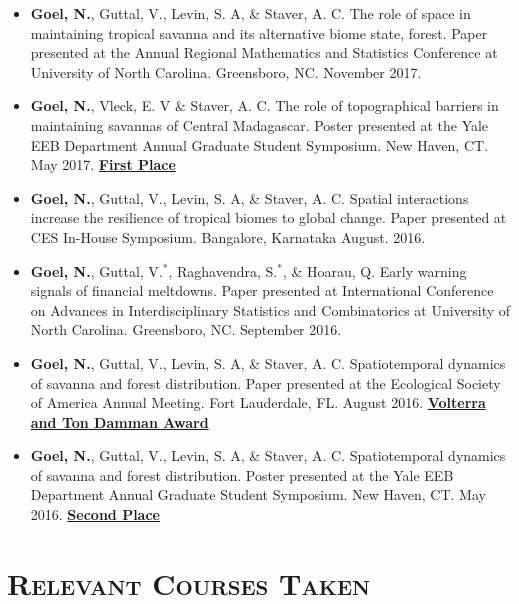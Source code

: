 \documentclass[11pt,a4paper,sans]{moderncv}        %
\begin{document}
\begin{itemize}

\item{\textbf{Goel, N.}, Guttal, V., Levin, S. A, \& Staver, A. C. The role of space in maintaining tropical savanna and its alternative biome state, forest. Paper presented at the Annual Regional Mathematics and Statistics Conference at University of North Carolina. Greensboro, NC. November 2017.}\\

\item{\textbf{Goel, N.}, Vleck, E. V \& Staver, A. C. The role of topographical barriers in maintaining savannas of Central Madagascar. Poster presented at the Yale EEB Department Annual Graduate Student Symposium. New Haven, CT. May 2017. \underline{\textbf{First Place}}}\\

\item{\textbf{Goel, N.}, Guttal, V., Levin, S. A, \& Staver, A. C. Spatial interactions increase the resilience of tropical biomes to global change. Paper presented at CES In-House Symposium. Bangalore, Karnataka August. 2016.}\\

\item{\textbf{Goel, N.}, Guttal, V.$^*$, Raghavendra, S.$^*$, \& Hoarau, Q. Early warning signals of financial meltdowns. Paper presented at International Conference on Advances in Interdisciplinary Statistics and Combinatorics at University of North Carolina. Greensboro, NC. September 2016.}\\

\item{\textbf{Goel, N.}, Guttal, V., Levin, S. A, \& Staver, A. C. Spatiotemporal dynamics of savanna and forest distribution. Paper presented at the Ecological Society of America Annual Meeting. Fort Lauderdale, FL. August 2016. \underline{\textbf{Volterra and Ton Damman Award}}}\\

\item{\textbf{Goel, N.}, Guttal, V., Levin, S. A, \& Staver, A. C. Spatiotemporal dynamics of savanna and forest distribution. Poster presented at the Yale EEB Department Annual Graduate Student Symposium. New Haven, CT. May 2016. \underline{\textbf{Second Place}}}\\

\end{itemize}

\section{\textsc{Relevant Courses Taken}}
\end{document}
